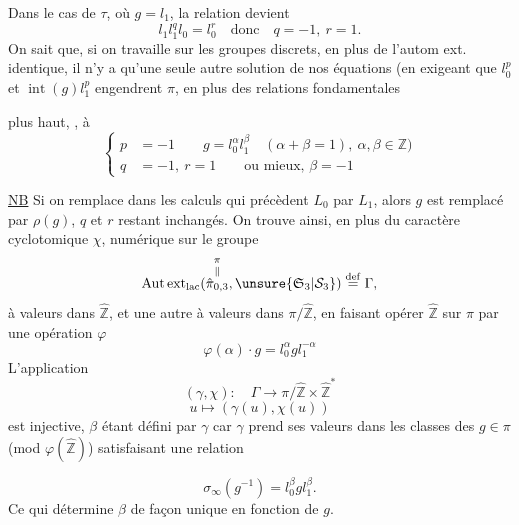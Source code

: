 Dans le cas de $\tau$, où $g=l_1$, la relation devient
\[
l_1l_1^ql_0=l_0^r\quad\text{donc}\quad q=-1,\ r=1.
\]
On sait que, si on travaille sur les groupes discrets, en plus de l'autom ext. identique, il n'y a qu'une seule autre solution de nos équations (en exigeant  que $l_0^p$ et $\operatorname{int}(g)l_1^p$ engendrent $\pi$, en plus des relations fondamentales

plus haut,  ,   à
\[
\left\{\begin{aligned}
p&=-1\qquad g=l_0^\alpha l_1^\beta\quad(\alpha+\beta=1),\ \alpha,\beta\in\mathbb Z)\\
q&=-1,\ r=1\qquad\text{ou mieux, }\beta=-1
\end{aligned}\right.
\]

\uline{NB} Si on remplace dans les calculs qui précèdent $L_0$ par $L_1$, alors $g$ est remplacé par $\rho(g)$, $q$ et $r$ restant inchangés. On trouve ainsi, en plus du caractère cyclotomique $\chi$,    numérique \inserted{\uline{$\beta$},} sur le groupe
\[
\operatorname{Aut\,ext}_{\mathrm{lac}}(\overset{\pi}{\overset{\Vert}{\hat\pi_{0,3}}},\unsure{\mathfrak S_3|\mathcal S_3})\overset{\mathrm{def}}=\Gamma,
\]
 à valeurs dans $\hat{\mathbb Z}$, et une autre \inserted{$\gamma$} à valeurs dans $\pi/\hat{\mathbb Z}$, en faisant opérer $\hat{\mathbb Z}$ sur $\pi$ par une opération $\varphi$
\[
\varphi(\alpha)\cdot g=l_0^\alpha gl_1^{-\alpha}
\]
L'application
\[
(\gamma,\chi):\quad\Gamma\longrightarrow\pi/\hat{\mathbb Z}\times\hat{\mathbb Z}^{*}
\]
\[
u\longmapsto(\gamma(u),\chi(u))
\]
est injective,  $\beta$ étant défini par $\gamma$ car $\gamma$ prend ses valeurs dans les classes des $g\in\pi$ (mod $\varphi(\hat{\mathbb Z})$) satisfaisant une relation

\[
\sigma_\infty(g^{-1})=l_0^\beta g l_1^\beta.
\]
Ce qui détermine $\beta$ de façon unique en fonction de $g$.


